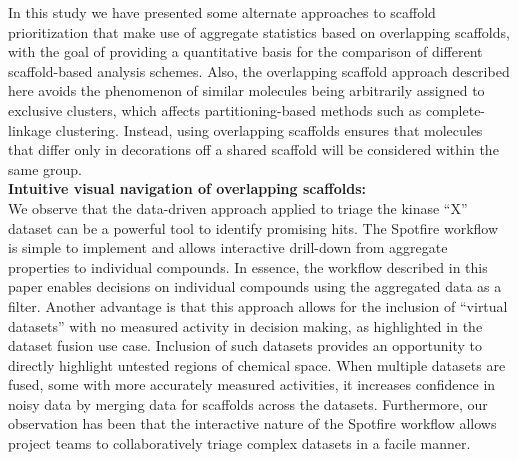 \documentclass[journal=jacsat,biochem,manuscript=article]{achemso}
\newcommand*\fref[1]{Figure~\ref{fig:#1}}
\begin{document}
In this study we have presented some alternate approaches to scaffold
prioritization that make use of aggregate statistics based on
overlapping scaffolds, with the goal of providing a quantitative basis
for the comparison of different scaffold-based analysis schemes.
Also, the overlapping scaffold approach described here
avoids the phenomenon of similar molecules being arbitrarily assigned to
exclusive clusters, which affects partitioning-based methods such as
complete-linkage clustering.  
Instead, using overlapping scaffolds ensures that
molecules that differ only in decorations off a shared scaffold
will be considered within the same group.\\

{\bf Intuitive visual navigation of overlapping scaffolds:}\\ 
We observe that the data-driven approach applied to triage the kinase ``X'' dataset
can be a powerful tool to identify promising hits.  The Spotfire workflow
is simple to implement and allows interactive drill-down from
aggregate properties to individual compounds. In essence,
the workflow described in this paper enables decisions on individual compounds
using the aggregated data as a filter. Another advantage is that this 
approach allows for the inclusion of ``virtual
datasets'' with no measured activity in decision making, as highlighted in the dataset fusion use case.  Inclusion of such datasets provides an opportunity to directly highlight untested regions of
chemical space. When multiple datasets are fused, some with more accurately measured activities, it increases confidence in noisy data by merging data for scaffolds across the
datasets.  Furthermore, our observation has been that the interactive nature 
of the Spotfire workflow allows project teams to collaboratively triage complex 
datasets in a facile manner.\\
\end{document}
